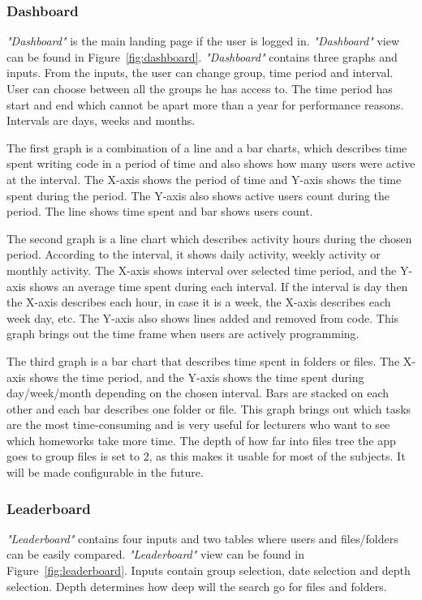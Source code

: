 \subsubsection{Dashboard}\label{subsubsec:dashboard}
\textit{"Dashboard"} is the main landing page if the user is logged in.
\textit{"Dashboard"} view can be found in Figure~\ref{fig:dashboard}.
\textit{"Dashboard"} contains three graphs and inputs.
From the inputs, the user can change group, time period and interval.
User can choose between all the groups he has access to.
The time period has start and end which cannot be apart more than a year for performance reasons.
Intervals are days, weeks and months.

The first graph is a combination of a line and a bar charts, which describes time spent writing code in a period of time and also shows how many users were active at the interval.
The X-axis shows the period of time and Y-axis shows the time spent during the period.
The Y-axis also shows active users count during the period.
The line shows time spent and bar shows users count.

The second graph is a line chart which describes activity hours during the chosen period.
According to the interval, it shows daily activity, weekly activity or monthly activity.
The X-axis shows interval over selected time period, and the Y-axis shows an average time spent during each interval.
If the interval is day then the X-axis describes each hour, in case it is a week, the X-axis describes each week day, etc.
The Y-axis also shows lines added and removed from code.
This graph brings out the time frame when users are actively programming.

The third graph is a bar chart that describes time spent in folders or files.
The X-axis shows the time period, and the Y-axis shows the time spent during day/week/month depending on the chosen interval.
Bars are stacked on each other and each bar describes one folder or file.
This graph brings out which tasks are the most time-consuming and is very useful for lecturers who want to see which homeworks take more time.
The depth of how far into files tree the app goes to group files is set to 2, as this makes
it usable for most of the subjects.
It will be made configurable in the future.

\subsubsection{Leaderboard}\label{subsubsec:leaderboard}
\textit{"Leaderboard"} contains four inputs and two tables where users and files/folders can be easily compared.
\textit{"Leaderboard"} view can be found in Figure~\ref{fig:leaderboard}.
Inputs contain group selection, date selection and depth selection.
Depth determines how deep will the search go for files and folders.

